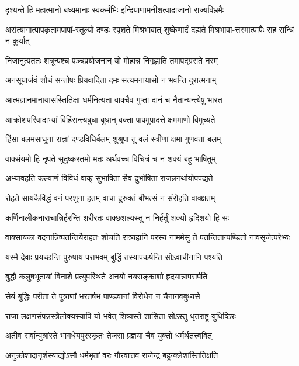 \twolineshloka
{दृश्यन्ते हि महात्मानो बध्यमानाः स्वकर्मभिः}
{इन्द्रियाणामनीशत्वाद्राजानो राज्यविभ्रमैः}


\twolineshloka
{असंत्यागात्पापकृतामपापां-स्तुल्यो दण्डः स्पृशते मिश्रभावात्}
{शुष्केणार्द्रं दह्यते मिश्रभावा-त्तस्मात्पापैः सह सन्धिं न कुर्यात्}


\twolineshloka
{निजानुत्पततः शत्रून्पश्च पञ्चप्रयोजनान्}
{यो मोहान्न निगृह्णाति तमापद्ग्रसते नरम्}


\twolineshloka
{अनसूयार्जवं शौचं सन्तोषः प्रियवादिता}
{दमः सत्यमनायासो न भवन्ति दुरात्मनाम्}


\twolineshloka
{आत्मज्ञानमानायासस्तितिक्षा धर्मनित्यता}
{वाक्चैव गुप्ता दानं च नैतान्यन्त्येषु भारत}


\twolineshloka
{आक्रोशपरिवादाभ्यां विहिंसन्त्यबुधा बुधान्}
{वक्ता पापमुपादत्ते क्षममाणो विमुच्यते}


\twolineshloka
{हिंसा बलमसाधूनां राज्ञां दण्डविधिर्बलम्}
{शुश्रूपा तु वलं स्त्रीणां क्षमा गुणवतां बलम्}


\twolineshloka
{वाक्संयमो हि नृपते सुदुष्करतमो मतः}
{अर्थवच्च विचित्रं च न शक्यं बहु भाषितुम्}


\twolineshloka
{अभ्यावहति कल्याणं विविधं वाक् सुभाषिता}
{सैव दुर्भाषिता राजन्ननर्थायोपपद्यते}


\twolineshloka
{रोहते सायकैर्विद्धं वनं परशुना हतम्}
{वाचा दुरुक्तं बीभत्सं न संरोहति वाक्क्षतम्}


\twolineshloka
{कर्णिनालीकनाराचान्निर्हरन्ति शरीरतः}
{वाक्छशल्यस्तु न निर्हर्तुं शक्यो हृदिशयो हि सः}


\twolineshloka
{वाक्सायका वदनान्निष्पतन्तियैराहतः शोचति रात्र्यहानि}
{परस्य नामर्मसु ते पतन्तितान्पण्डितो नावसृजेत्परेभ्यः}


\twolineshloka
{यस्मै देवाः प्रयच्छन्ति पुरुषाय पराभवम्}
{बुद्धिं तस्यापकर्षन्ति सोऽवाचीनानि पश्यति}


\twolineshloka
{बुद्धौ कलुषभूतायां विनाशे प्रत्युपस्थिते}
{अनयो नयसङ्काशो हृदयान्नापसर्पति}


\twolineshloka
{सेयं बुद्धिः परीता ते पुत्राणां भरतर्षभ}
{पाण्डवानां विरोधेन न चैनानवबुध्यसे}


\twolineshloka
{राजा लक्षणसंपन्नस्त्रैलोक्यस्यापि यो भवेत्}
{शिष्यस्ते शासिता सोऽस्तु धृतराष्ट्र युधिष्ठिरः}


\twolineshloka
{अतीव सर्वान्पुत्रांस्ते भागधेयपुरस्कृतः}
{तेजसा प्रज्ञया चैव युक्तो धर्मर्थतत्त्ववित्}


\twolineshloka
{अनुक्रोशादानृशंस्याद्योऽसौ धर्मभृतां वरः}
{गौरवात्तव राजेन्द्र बहून्क्लेशांस्तितिक्षति}


